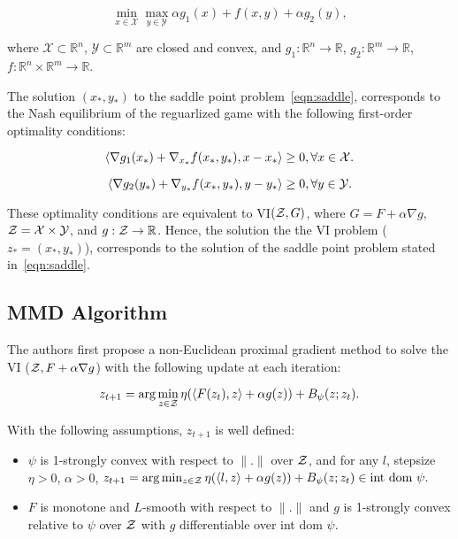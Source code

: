 \begin{equation}
	\label{eqn:saddle} \min_{x \in \mathcal{X}}
	\max_{y \in \mathcal{Y}} \alpha g_1(x) + f(x, y) + \alpha g_2(y),
\end{equation}

where $\mathcal{X} \subset \mathbb{R}^n$, $\mathcal{Y} \subset \mathbb{R}^m$
are closed and convex, and $g_1: \mathbb{R}^n \rightarrow \mathbb{R}$, $g_2: \mathbb{R}^m
	\rightarrow \mathbb{R}$, $f : \mathbb{R}^n \times \mathbb{R}^m \rightarrow \mathbb{R}$.

The solution $(x_{\ast}, y_{\ast})$ to the saddle point problem~\ref{eqn:saddle}, corresponds to
the Nash equilibrium of the reguarlized game with the following first-order optimality conditions:

\begin{equation}
	\label{eqn:optcon1} \langle \nabla g_1(x_*) + \nabla_{x_*}
	f(x_*, y_*), x - x_* \rangle \geq 0, \forall x \in \mathcal{X}.
\end{equation}

\begin{equation}
	\label{eqn:optcon2}
	\langle \nabla g_2(y_*) + \nabla_{y_*} f(x_*, y_*),
	y - y_* \rangle \geq 0, \forall y \in \mathcal{Y}.
\end{equation}

These optimality conditions are equivalent to VI$(\mathcal{Z}, G)$, where $G = F + \alpha \nabla g$,
$\mathcal{Z} = \mathcal{X} \times \mathcal{Y}$, and $g: \mathcal{Z} \rightarrow \mathbb{R}$.
Hence, the solution the the VI problem ($z_{\ast}= (x_{\ast}, y_{\ast})$), corresponds to the
solution of the saddle point problem stated in~\ref{eqn:saddle}.

\subsection{MMD Algorithm}

The authors first propose a non-Euclidean proximal gradient method to solve the VI ($\mathcal{Z}, F +
	\alpha \nabla g$) with the following update at each iteration:

\begin{equation}
	\label{eqn:proxgrad} z_{t+1} = \arg \min_{z \in \mathcal{Z}} \eta (\langle F(z_t), z\rangle + \alpha
	g(z)) + B_{\psi} (z; z_t).
\end{equation}

With the following assumptions, $z_{t+1}$ is well defined:

\begin{itemize}
	\item $\psi$ is 1-strongly convex with respect to $\|.
		      \|$ over $\mathcal{Z}$, and for
	      any $l$, stepsize $\eta > 0$, $\alpha > 0$,
	      $z_{t+1} = \arg \min_{z \in \mathcal{Z}} \eta (\langle l, z \rangle + \alpha g(z)) + B_{\psi}(z;z_t) \in \text{int dom } \psi.$

	\item $F$ is monotone and $L$-smooth with respect to $\|.\|$ and $g$ is 1-strongly convex
	      relative to $\psi$ over $\mathcal{Z}$ with $g$ differentiable over int dom $\psi$.
\end{itemize}


